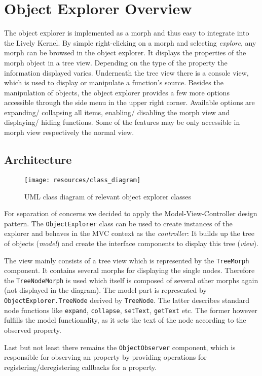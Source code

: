 \section{Object Explorer Overview} %
The object explorer is implemented as a morph and thus easy to integrate into the Lively Kernel. By simple right-clicking on a morph and selecting \emph{explore}, any morph can be browsed in the object explorer. It displays the properties of the morph object in a tree view. Depending on the type of the property the information displayed varies. Underneath the tree view there is a console view, which is used to display or manipulate a function's source. Besides the manipulation of objects, the object explorer provides a few more options accessible through the side menu in the upper right corner. Available options are expanding/ collapsing all items, enabling/ disabling the morph view and displaying/ hiding functions. Some of the features may be only accessible in morph view respectively the normal view.

\subsection{Architecture} %

\begin{figure}[hb]
  \centering
  \texttt{[image: resources/class\_diagram]}
  \caption{UML class diagram of relevant object explorer classes}
  \label{fig:abb1}
\end{figure}

For separation of concerns we decided to apply the Model-View-Controller design pattern. The \lstinline|ObjectExplorer| class can be used to create instances of the explorer and behaves in the MVC context as the \emph{controller}: It builds up the tree of objects (\emph{model}) and create the interface components to display this tree (\emph{view}).

The view mainly consists of a tree view which is represented by the \lstinline|TreeMorph| component. It contains several morphs for displaying the single nodes. Therefore the \lstinline|TreeNodeMorph| is used which itself is composed of several other morphs again (not displayed in the diagram). The model part is represented by \lstinline|ObjectExplorer.TreeNode| derived by \lstinline|TreeNode|. The latter describes standard node functions like \lstinline|expand|, \lstinline|collapse|, \lstinline|setText|, \lstinline|getText| etc. The former however fulfills the model functionality, as it sets the text of the node according to the observed property.

Last but not least there remains the \lstinline|ObjectObserver| component, which is responsible for observing an property by providing operations for registering/deregistering callbacks for a property.